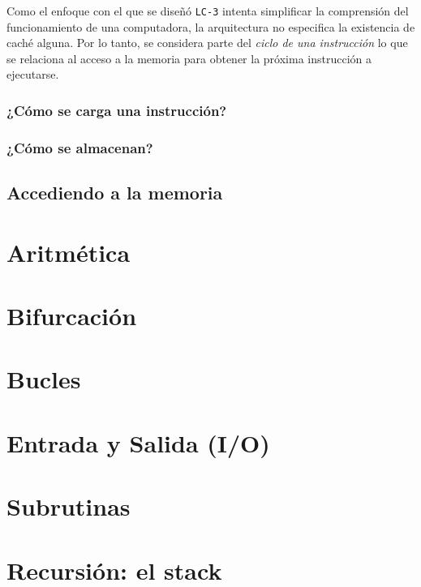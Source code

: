 \documentclass[a4paper, titlepage]{report}
\begin{document}
	Como el enfoque con el que se diseñó \texttt{LC-3} intenta simplificar la comprensión del funcionamiento de una computadora, la arquitectura no especifica la existencia de caché alguna. Por lo tanto, se considera parte del \textit{ciclo de una instrucción} lo que se relaciona al acceso a la memoria para obtener la próxima instrucción a ejecutarse.
	
	\subsubsection{¿Cómo se carga una instrucción?} %
	
	
	\subsubsection{¿Cómo se almacenan?} %
	
	\subsection{Accediendo a la memoria} %
	
	\section{Aritmética}
	\label{sec:arithmetic}
	
	\section{Bifurcación} %
	\label{sec:branching}
	
	\section{Bucles} %
	
	\section{Entrada y Salida (I/O)}
	\label{sec:io}
	
	\section{Subrutinas}
	
	\section{Recursión: el stack}
	
\end{document}
